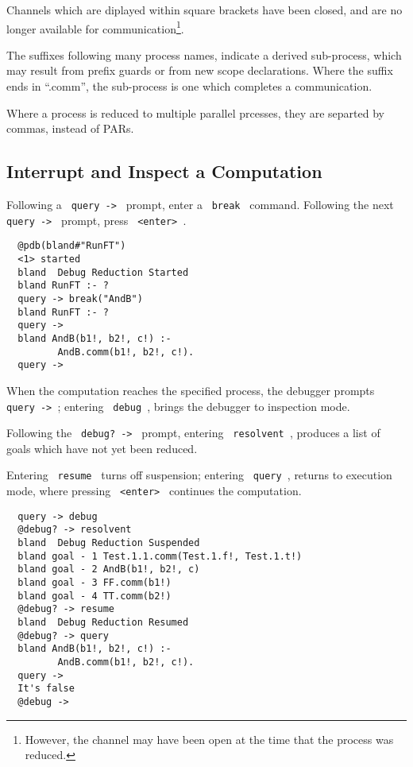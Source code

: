\noindent
Channels which are diplayed within square brackets have been
closed, and are no longer available for communication\footnote{
However, the channel may have been open at the time that the
process was reduced.}.

\noindent
The suffixes following many process names, indicate a derived
sub-process, which may result from prefix guards or from new
scope declarations.  Where the suffix ends in ``.comm'', the
sub-process is one which completes a communication.

\noindent
Where a process is reduced to multiple parallel prcesses, they
are separted by commas, instead of PARs.

\subsection{Interrupt and Inspect a Computation}

Following a \verb+ query -> + prompt, enter a \verb+ break + command.
Following the next \verb+ query -> + prompt, press \verb+ <enter> +.

\begin{verbatim}
  @pdb(bland#"RunFT")
  <1> started
  bland  Debug Reduction Started
  bland RunFT :- ?
  query -> break("AndB")
  bland RunFT :- ?
  query -> 
  bland AndB(b1!, b2!, c!) :- 
         AndB.comm(b1!, b2!, c!).
  query -> 
\end{verbatim}

\noindent
When the computation reaches the specified process, the
debugger prompts \verb+ query -> +;
entering \verb+ debug +, brings the debugger
to inspection mode.

\noindent
Following the \verb+ debug? -> + prompt, entering
\verb+ resolvent +, produces a list
of goals which have not yet been reduced.

\noindent
Entering \verb+ resume + turns off suspension;
entering \verb+ query +, returns to execution
mode, where pressing \verb+ <enter> + continues the computation.

\begin{verbatim}
  query -> debug
  @debug? -> resolvent
  bland  Debug Reduction Suspended
  bland goal - 1 Test.1.1.comm(Test.1.f!, Test.1.t!)
  bland goal - 2 AndB(b1!, b2!, c)
  bland goal - 3 FF.comm(b1!)
  bland goal - 4 TT.comm(b2!)
  @debug? -> resume
  bland  Debug Reduction Resumed
  @debug? -> query
  bland AndB(b1!, b2!, c!) :- 
         AndB.comm(b1!, b2!, c!).
  query -> 
  It's false
  @debug ->
\end{verbatim}

